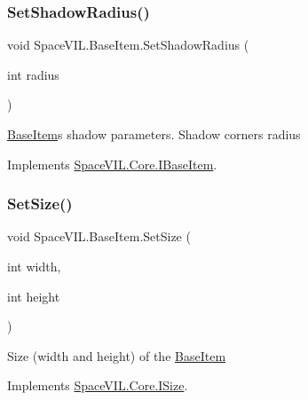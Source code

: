 \subsubsection{\texorpdfstring{Set\+Shadow\+Radius()}{SetShadowRadius()}}
{\footnotesize\ttfamily void Space\+V\+I\+L.\+Base\+Item.\+Set\+Shadow\+Radius (\begin{DoxyParamCaption}\item[{int}]{radius }\end{DoxyParamCaption})\hspace{0.3cm}{\ttfamily [inline]}}



\mbox{\hyperlink{class_space_v_i_l_1_1_base_item}{Base\+Item}}\textquotesingle{}s shadow parameters. Shadow corners radius 



Implements \mbox{\hyperlink{interface_space_v_i_l_1_1_core_1_1_i_base_item}{Space\+V\+I\+L.\+Core.\+I\+Base\+Item}}.

\mbox{\label{class_space_v_i_l_1_1_base_item_a4ac00a12fcbf63a467fcb4fc11652513}} 
\subsubsection{\texorpdfstring{Set\+Size()}{SetSize()}}
{\footnotesize\ttfamily void Space\+V\+I\+L.\+Base\+Item.\+Set\+Size (\begin{DoxyParamCaption}\item[{int}]{width,  }\item[{int}]{height }\end{DoxyParamCaption})\hspace{0.3cm}{\ttfamily [inline]}}



Size (width and height) of the \mbox{\hyperlink{class_space_v_i_l_1_1_base_item}{Base\+Item}} 



Implements \mbox{\hyperlink{interface_space_v_i_l_1_1_core_1_1_i_size}{Space\+V\+I\+L.\+Core.\+I\+Size}}.

\mbox{\label{class_space_v_i_l_1_1_base_item_ae07c14607caf666e80c40f9f0df2882a}} 
